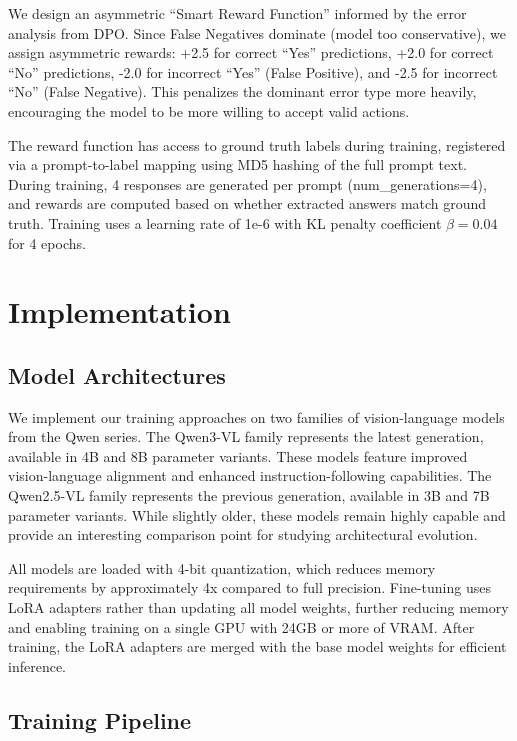 \documentclass[11pt,a4paper]{article}
\begin{document}
We design an asymmetric ``Smart Reward Function'' informed by the error analysis from DPO. Since False Negatives dominate (model too conservative), we assign asymmetric rewards: +2.5 for correct ``Yes'' predictions, +2.0 for correct ``No'' predictions, -2.0 for incorrect ``Yes'' (False Positive), and -2.5 for incorrect ``No'' (False Negative). This penalizes the dominant error type more heavily, encouraging the model to be more willing to accept valid actions.

The reward function has access to ground truth labels during training, registered via a prompt-to-label mapping using MD5 hashing of the full prompt text. During training, 4 responses are generated per prompt (num\_generations=4), and rewards are computed based on whether extracted answers match ground truth. Training uses a learning rate of 1e-6 with KL penalty coefficient $\beta=0.04$ for 4 epochs.


\section{Implementation}

\subsection{Model Architectures}

We implement our training approaches on two families of vision-language models from the Qwen series. The Qwen3-VL family represents the latest generation, available in 4B and 8B parameter variants. These models feature improved vision-language alignment and enhanced instruction-following capabilities. The Qwen2.5-VL family represents the previous generation, available in 3B and 7B parameter variants. While slightly older, these models remain highly capable and provide an interesting comparison point for studying architectural evolution.

All models are loaded with 4-bit quantization, which reduces memory requirements by approximately 4x compared to full precision. Fine-tuning uses LoRA adapters rather than updating all model weights, further reducing memory and enabling training on a single GPU with 24GB or more of VRAM. After training, the LoRA adapters are merged with the base model weights for efficient inference.

\subsection{Training Pipeline}
\end{document}
